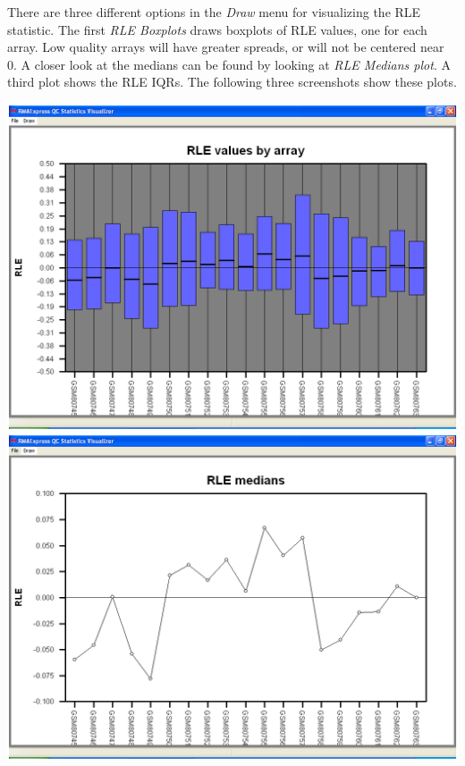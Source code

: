 \documentclass[11pt]{report}
\begin{document}
There are three different options in the {\it Draw} menu for visualizing the RLE statistic. The first {\it RLE Boxplots} draws boxplots of RLE values, one for each array. Low quality arrays will have greater spreads, or will not be centered near 0. A closer look at the medians can be found by looking at {\it RLE Medians plot}. A third plot shows the RLE IQRs. The following three screenshots show these plots.
\begin{center}
\includegraphics[scale=0.4]{RLEBoxplot.png}\\
\includegraphics[scale=0.4]{RLEMedians.png}\\

\end{center}
\end{document}
